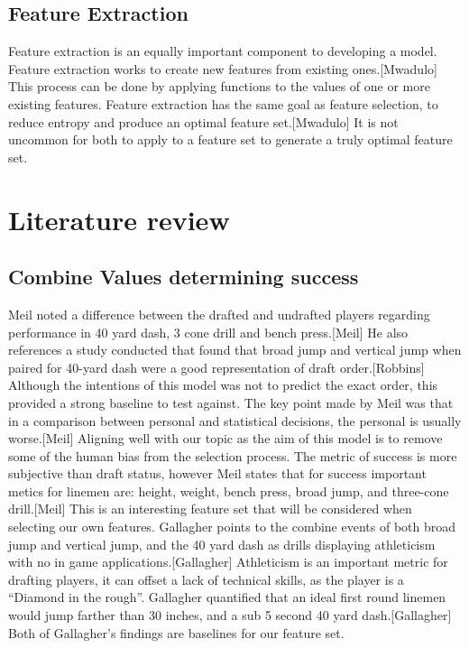 \documentclass[confrence]{IEEEtran}
\begin{document}
\subsection*{Feature Extraction}
Feature extraction is an equally important component to developing a model.
Feature extraction works to create new features from existing ones.[Mwadulo]
This process can be done by applying functions to the values of one or more existing features.
Feature extraction has the same goal as feature selection, to reduce entropy and produce an optimal feature set.[Mwadulo]
It is not uncommon for both to apply to a feature set to generate a truly optimal feature set.
\section*{Literature review}
\subsection*{Combine Values determining success}
Meil noted a difference between the drafted and undrafted players regarding performance in 40 yard dash, 3 cone drill and bench press.[Meil]
He also references a study conducted that found that broad jump and vertical jump when paired for 40-yard dash were a good representation of draft order.[Robbins]
Although the intentions of this model was not to predict the exact order, this provided a strong baseline to test against.
The key point made by Meil was that in a comparison between personal and statistical decisions, the personal is usually worse.[Meil]
Aligning well with our topic as the aim of this model is to remove some of the human bias from the selection process.
The metric of success is more subjective than draft status, however Meil states that for success important metics for linemen are: height, weight, bench press, broad jump, and three-cone drill.[Meil]
This is an interesting feature set that will be considered when selecting our own features.
Gallagher points to the combine events of both broad jump and vertical jump, and the 40 yard dash as drills displaying athleticism with no in game applications.[Gallagher]
Athleticism is an important metric for drafting players, it can offset a lack of technical skills, as the player is a “Diamond in the rough”.
Gallagher quantified that an ideal first round linemen would jump farther than 30 inches, and a sub 5 second 40 yard dash.[Gallagher]
Both of Gallagher's findings are baselines for our feature set.
\end{document}
